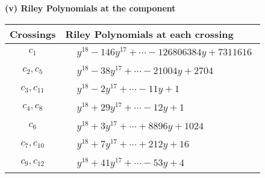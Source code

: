 \documentclass[1p]{elsarticle_modified}
\theoremstyle{definition}
\begin{document}
\flushleft \textbf{(v) Riley Polynomials at the component}\newline \\
\begin{tabular}{m{50pt}|m{274pt}}
Crossings & \hspace{64pt}Riley Polynomials at each crossing \\
\hline $$\begin{aligned}c_{1}\end{aligned}$$&$\begin{aligned}
&y^{18}-146 y^{17}+\cdots-126806384 y+7311616
\end{aligned}$\\
\hline $$\begin{aligned}c_{2},c_{5}\end{aligned}$$&$\begin{aligned}
&y^{18}-38 y^{17}+\cdots-21004 y+2704
\end{aligned}$\\
\hline $$\begin{aligned}c_{3},c_{11}\end{aligned}$$&$\begin{aligned}
&y^{18}-2 y^{17}+\cdots-11 y+1
\end{aligned}$\\
\hline $$\begin{aligned}c_{4},c_{8}\end{aligned}$$&$\begin{aligned}
&y^{18}+29 y^{17}+\cdots-12 y+1
\end{aligned}$\\
\hline $$\begin{aligned}c_{6}\end{aligned}$$&$\begin{aligned}
&y^{18}+3 y^{17}+\cdots+8896 y+1024
\end{aligned}$\\
\hline $$\begin{aligned}c_{7},c_{10}\end{aligned}$$&$\begin{aligned}
&y^{18}+7 y^{17}+\cdots+212 y+16
\end{aligned}$\\
\hline $$\begin{aligned}c_{9},c_{12}\end{aligned}$$&$\begin{aligned}
&y^{18}+41 y^{17}+\cdots-53 y+4
\end{aligned}$\\
\hline
\end{tabular}\\~\\
\end{document}
